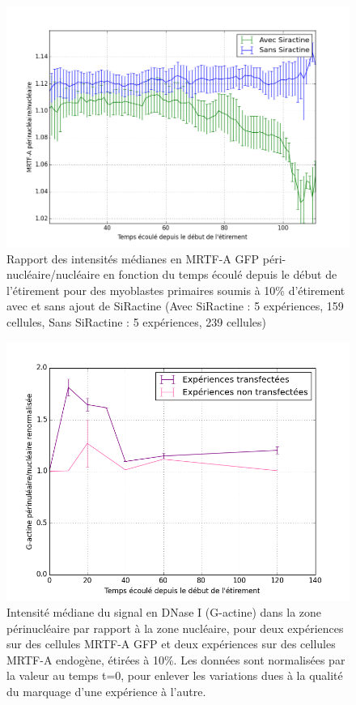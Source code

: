 \documentclass                                                                                                                                                                                                                                                                                                                                       {report}
\begin{document}
\begin{figure}[p]
\includegraphics[scale=0.4]{Figures/Avec_Sans_Siractine.png} 
\caption{Rapport des intensités médianes en MRTF-A GFP  péri-nucléaire/nucléaire en fonction du temps écoulé depuis le début de l'étirement pour des myoblastes primaires soumis à 10\% d'étirement avec et sans ajout de SiRactine (Avec SiRactine : 5 expériences, 159 cellules, Sans SiRactine : 5 expériences, 239 cellules)}
\end{figure}

\begin{figure}[p]
\includegraphics[scale=0.5]{Figures/Et10_G_ratio.png} 
\caption{\label{Et10_G} Intensité médiane du signal en DNase I (G-actine) dans la zone périnucléaire par rapport à la zone nucléaire, pour deux expériences sur des cellules MRTF-A GFP et deux expériences sur des cellules MRTF-A endogène, étirées à 10\%. Les données sont normalisées par la valeur au temps t=0, pour enlever les variations dues à la qualité du marquage d'une expérience à l'autre.}
\end{figure}
\end{document}
